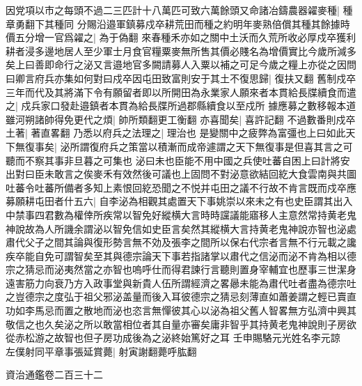 因党項以市之每頭不過二三匹計十八萬匹可致六萬餘頭又命諸冶鑄農器糴麥種|{
	種章勇翻下其種同}
分賜沿邉軍鎮募戍卒耕荒田而種之約明年麥熟倍償其種其餘據時價五分增一官爲糴之|{
	為于偽翻}
來春種禾亦如之關中土沃而久荒所收必厚戍卒獲利耕者浸多邊地居人至少軍士月食官糧粟麥無所售其價必賤名為增價實比今歲所減多矣上曰善即命行之泌又言邉地官多闕請募人入粟以補之可足今歲之糧上亦從之因問曰卿言府兵亦集如何對曰戍卒因屯田致富則安于其土不復思歸|{
	復扶又翻}
舊制戍卒三年而代及其將滿下令有願留者即以所開田為永業家人願來者本貫給長牒續食而遣之|{
	戍兵家口發赴邉鎮者本貫為給長牒所過郡縣續食以至戍所}
據應募之數移報本道雖河朔諸帥得免更代之煩|{
	帥所類翻更工衡翻}
亦喜聞矣|{
	喜許記翻}
不過數番則戍卒土著|{
	著直畧翻}
乃悉以府兵之法理之|{
	理治也}
是變關中之疲弊為富彊也上曰如此天下無復事矣|{
	泌所謂復府兵之策當以積漸而成帝遽謂之天下無復事是但喜其言之可聽而不察其事非旦暮之可集也}
泌曰未也臣能不用中國之兵使吐蕃自困上曰計將安出對曰臣未敢言之俟麥禾有效然後可議也上固問不對泌意欲結回紇大食雲南與共圖吐蕃令吐蕃所備者多知上素恨回紇恐聞之不悦并屯田之議不行故不肯言既而戍卒應募願耕屯田者什五六|{
	自李泌為相觀其處置天下事姚崇以來未之有也史臣謂其出入中禁事四君數為權倖所疾常以智免好縱横大言時時讜議能寤移人主意然常持黄老鬼神說故為人所譏余謂泌以智免信如史臣言矣然其縱横大言持黄老鬼神說亦智也泌處肅代父子之間其論與復形勢言無不効及張李之間所以保右代宗者言無不行元載之讒疾卒能自免可謂智矣至其與德宗論天下事若指諸掌以肅代之信泌而泌不肯為相以德宗之猜忌而泌夷然當之亦智也嗚呼仕而得君諫行言聽則置身宰輔宜也歷事三世潔身遠害筋力向衰乃方入政事堂與新貴人伍所謂經濟之畧曏未能為肅代吐者盡為德宗吐之豈德宗之度弘于祖父邪泌盖量而後入耳彼德宗之猜忌刻薄直如蕭姜謂之輕已賣直功如李馬忌而置之散地而泌也恣言無憚彼其心以泌為祖父舊人智畧無方弘濟中興其敬信之也久矣泌之所以敢當相位者其自量亦審矣庸非智乎其持黄老鬼神說則子房欲從赤松游之故智也但子房功成後為之泌終始篤好之耳}
壬申賜駱元光姓名李元諒　左僕射同平章事張延賞薨|{
	射寅謝翻薨呼肱翻}


資治通鑑卷二百三十二

